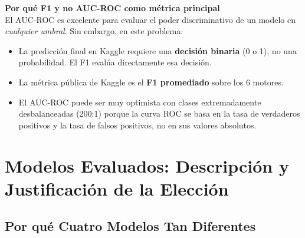 \documentclass[12pt,a4paper]{article}
\begin{document}
\begin{porquebox}
\textbf{Por qu\'{e} F1 y no AUC-ROC como m\'{e}trica principal}\\[4pt]
El AUC-ROC es excelente para evaluar el poder discriminativo de un modelo en
\textit{cualquier umbral}. Sin embargo, en este problema:
\begin{itemize}[itemsep=2pt]
  \item La predicci\'{o}n final en Kaggle requiere una \textbf{decisi\'{o}n binaria} (0 o 1),
    no una probabilidad. El F1 eval\'{u}a directamente esa decisi\'{o}n.
  \item La m\'{e}trica p\'{u}blica de Kaggle es el \textbf{F1 promediado} sobre los 6 motores.
  \item El AUC-ROC puede ser muy optimista con clases extremadamente desbalanceadas
    (200:1) porque la curva ROC se basa en la tasa de verdaderos positivos y
    la tasa de falsos positivos, no en sus valores absolutos.
\end{itemize}
\end{porquebox}

\section{Modelos Evaluados: Descripci\'{o}n y Justificaci\'{o}n de la Elecci\'{o}n}

\subsection{Por qu\'{e} Cuatro Modelos Tan Diferentes}
\end{document}
